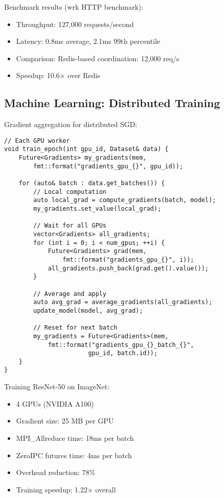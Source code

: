 \documentclass[11pt]{article}
\begin{document}
Benchmark results (wrk HTTP benchmark):
\begin{itemize}
\item Throughput: 127,000 requests/second
\item Latency: 0.8ms average, 2.1ms 99th percentile
\item Comparison: Redis-based coordination: 12,000 req/s
\item Speedup: 10.6× over Redis
\end{itemize}

\subsection{Machine Learning: Distributed Training}

Gradient aggregation for distributed SGD:

\begin{lstlisting}
// Each GPU worker
void train_epoch(int gpu_id, Dataset& data) {
    Future<Gradients> my_gradients(mem, 
        fmt::format("gradients_gpu_{}", gpu_id));
    
    for (auto& batch : data.get_batches()) {
        // Local computation
        auto local_grad = compute_gradients(batch, model);
        my_gradients.set_value(local_grad);
        
        // Wait for all GPUs
        vector<Gradients> all_gradients;
        for (int i = 0; i < num_gpus; ++i) {
            Future<Gradients> grad(mem,
                fmt::format("gradients_gpu_{}", i));
            all_gradients.push_back(grad.get().value());
        }
        
        // Average and apply
        auto avg_grad = average_gradients(all_gradients);
        update_model(model, avg_grad);
        
        // Reset for next batch
        my_gradients = Future<Gradients>(mem,
            fmt::format("gradients_gpu_{}_batch_{}", 
                       gpu_id, batch.id));
    }
}
\end{lstlisting}

Training ResNet-50 on ImageNet:
\begin{itemize}
\item 4 GPUs (NVIDIA A100)
\item Gradient size: 25 MB per GPU
\item MPI\_Allreduce time: 18ms per batch
\item ZeroIPC futures time: 4ms per batch
\item Overhead reduction: 78\%
\item Training speedup: 1.22× overall
\end{itemize}
\end{document}
